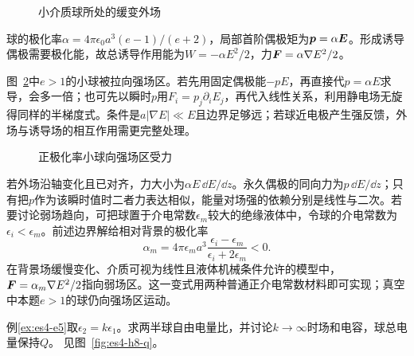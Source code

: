 \begin{figure}[H]\centering
{}
\caption{小介质球所处的缓变外场}\label{fig:es4-h7-q}
\end{figure}
\begin{solution}
球的极化率$\alpha=4\pi\epsilon_0a^3(e-1)/(e+2)$，局部首阶偶极矩为$\bm{p}=\alpha\bm{E}$。形成诱导偶极需要极化能，故总诱导作用能为$W=-\alpha E^2/2$，力$\bm{F}=\alpha\nabla E^2/2$。

图~\ref{fig:es4-h7-s}中$e>1$的小球被拉向强场区。若先用固定偶极能$-pE$，再直接代$p=\alpha E$求导，会多一倍；也可先以瞬时$p$用$F_i=p_j\partial_iE_j$，再代入线性关系，利用静电场无旋得同样的半梯度式。条件是$a|\nabla E|\ll E$且边界足够远；若球近电极产生强反馈，外场与诱导场的相互作用需更完整处理。
\begin{figure}[H]\centering
{}
\caption{正极化率小球向强场区受力}\label{fig:es4-h7-s}
\end{figure}


若外场沿轴变化且已对齐，力大小为$\alpha E\,\dd E/\dd z$。永久偶极的同向力为$p\,\dd E/\dd z$；只有把$p$作为该瞬时值时二者力表达相似，能量对场强的依赖分别是线性与二次。若要讨论弱场趋向，可把球置于介电常数$\epsilon_m$较大的绝缘液体中，令球的介电常数为$\epsilon_i<\epsilon_m$。前述边界解给相对背景的极化率
\[\alpha_m=4\pi\epsilon_ma^3\frac{\epsilon_i-\epsilon_m}{\epsilon_i+2\epsilon_m}<0.
\]
在背景场缓慢变化、介质可视为线性且液体机械条件允许的模型中，$\bm{F}=\alpha_m\nabla E^2/2$指向弱场区。这一变式用两种普通正介电常数材料即可实现；真空中本题$e>1$的球仍向强场区运动。
\end{solution}

\begin{exercise}[分界球的自由电荷与电容极限]\label{ex:es4-h8}
例\ref{ex:es4-e5}取$\epsilon_2=k\epsilon_1$。求两半球自由电量比，并讨论$k\to\infty$时场和电容，球总电量保持$Q$。 见图~\ref{fig:es4-h8-q}。
\end{exercise}

